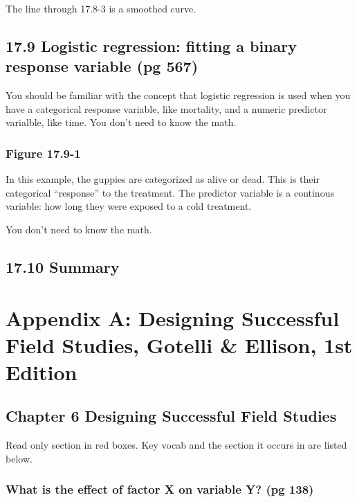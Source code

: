 \documentclass[]{book}
\theoremstyle{definition}
\theoremstyle{definition}
\theoremstyle{definition}
\theoremstyle{remark}
\begin{document}
The line through 17.8-3 is a smoothed curve.

\section{17.9 Logistic regression: fitting a binary response variable
(pg
567)}\label{logistic-regression-fitting-a-binary-response-variable-pg-567}

You should be familiar with the concept that logistic regression is used
when you have a categorical response variable, like mortality, and a
numeric predictor varialble, like time. You don't need to know the math.

\subsection{Figure 17.9-1}\label{figure-17.9-1}

In this example, the guppies are categorized as alive or dead. This is
their categorical ``response'' to the treatment. The predictor variable
is a continous variable: how long they were exposed to a cold treatment.

You don't need to know the math.

\section{17.10 Summary}\label{summary-7}

\appendix


\chapter{Appendix A: Designing Successful Field Studies, Gotelli \&
Ellison, 1st
Edition}\label{appendix-a-designing-successful-field-studies-gotelli-ellison-1st-edition}

\section{Chapter 6 Designing Successful Field
Studies}\label{chapter-6-designing-successful-field-studies}

Read only section in red boxes. Key vocab and the section it occurs in
are listed below.

\subsection{What is the effect of factor X on variable Y? (pg
138)}\label{what-is-the-effect-of-factor-x-on-variable-y-pg-138}
\end{document}
